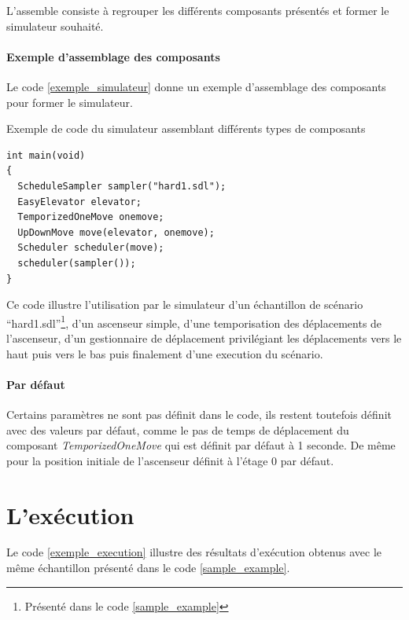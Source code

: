 \documentclass[twocolumn,oneside,10pt]{article}
\begin{document}
L'assemble consiste à regrouper les différents composants présentés et former le simulateur souhaité.

\paragraph{Exemple d'assemblage des composants}

Le code \ref{exemple_simulateur} donne un exemple d'assemblage des composants pour former le simulateur.

\begin{algorithm}[h]
  \caption{Exemple de code du simulateur assemblant différents types de composants}
  \label{exemple_simulateur}
\begin{verbatim}
int main(void)
{
  ScheduleSampler sampler("hard1.sdl");
  EasyElevator elevator;
  TemporizedOneMove onemove;
  UpDownMove move(elevator, onemove);
  Scheduler scheduler(move);
  scheduler(sampler());
}
\end{verbatim}
\end{algorithm}

Ce code illustre l'utilisation par le simulateur d'un échantillon de scénario ``hard1.sdl''\footnote{Présenté dans le code \ref{sample_example}}, d'un ascenseur simple, d'une temporisation des déplacements de l'ascenseur, d'un gestionnaire de déplacement privilégiant les déplacements vers le haut puis vers le bas puis finalement d'une execution du scénario.

\paragraph{Par défaut}

Certains paramètres ne sont pas définit dans le code, ils restent toutefois définit avec des valeurs par défaut, comme le pas de temps de déplacement du composant {\em TemporizedOneMove} qui est définit par défaut à 1 seconde. De même pour la position initiale de l'ascenseur définit à l'étage 0 par défaut.

\section{L'exécution}

Le code \ref{exemple_execution} illustre des résultats d'exécution obtenus avec le même échantillon présenté dans le code \ref{sample_example}.
\end{document}
